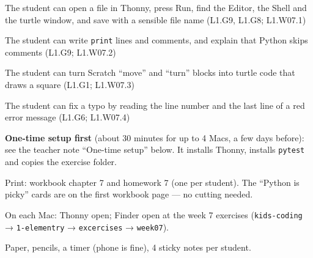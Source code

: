 
\begin{objectives}
  \item The student can open a file in Thonny, press Run, find the Editor, the Shell and the turtle window, and save with a sensible file name (L1.G9, L1.G8; L1.W07.1)
  \item The student can write \texttt{print} lines and comments, and explain that Python skips comments (L1.G9; L1.W07.2)
  \item The student can turn Scratch \enquote{move} and \enquote{turn} blocks into turtle code that draws a square (L1.G1; L1.W07.3)
  \item The student can fix a typo by reading the line number and the last line of a red error message (L1.G6; L1.W07.4)
\end{objectives}

\begin{materials}
  \item \textbf{One-time setup first} (about 30 minutes for up to 4 Macs, a few days before): see the teacher note \enquote{One-time setup} below. It installs Thonny, installs \texttt{pytest} and copies the exercise folder.
  \item Print: workbook chapter 7 and homework 7 (one per student). The \enquote{Python is picky} cards are on the first workbook page --- no cutting needed.
  \item On each Mac: Thonny open; Finder open at the week 7 exercises (\texttt{kids-coding} → \texttt{1-elementry} → \texttt{excercises} → \texttt{week07}).
  \item Paper, pencils, a timer (phone is fine), 4 sticky notes per student.
\end{materials}

